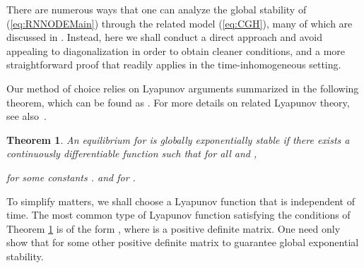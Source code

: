 \documentclass{article} \usepackage{iclr2021_conference,times}
\newtheorem{theorem}{Theorem}
\begin{document}
There are numerous ways that one can analyze the global stability of (\ref{eq:RNNODEMain}) through the related model (\ref{eq:CGH}), many of which are discussed in \cite{zhang2014comprehensive}. Instead, here we shall conduct a direct approach and avoid appealing to diagonalization in order to obtain cleaner conditions, and a more straightforward proof that readily applies in the time-inhomogeneous setting.

Our method of choice relies on Lyapunov arguments summarized in the following theorem, which can be found as \cite[Theorem 4.10]{khalil2002nonlinear}. For more details on related Lyapunov theory, see also~\cite{hahn1967stability, sastry2013nonlinear}.
\begin{theorem}
\label{thm:Lyapunov}
	An equilibrium  for  is globally exponentially stable if there exists a continuously differentiable function  such that for all  and ,
	
	for some constants .
	and  for . 
\end{theorem}

To simplify matters, we shall choose a Lyapunov function  that is independent of time. The most common type of Lyapunov function satisfying the conditions of Theorem \ref{thm:Lyapunov} is of the form , where  is a positive definite matrix. One need only show that  for some other positive definite matrix  to guarantee global exponential stability.
\end{document}
